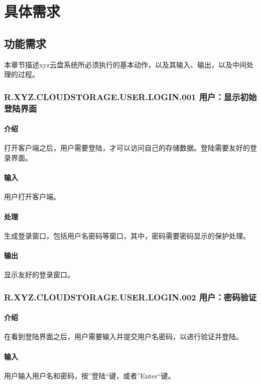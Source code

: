 \chapter{具体需求}
\section{功能需求}

本章节描述xyz云盘系统所必须执行的基本动作，以及其输入、输出，以及中间处理的过程。


\subsection{R.XYZ.CLOUDSTORAGE.USER.LOGIN.001 用户：显示初始登陆界面 }

\subsubsection{介绍}
打开客户端之后，用户需要登陆，才可以访问自己的存储数据。登陆需要友好的登录界面。

\subsubsection{输入}
用户打开客户端。

\subsubsection{处理}
生成登录窗口，包括用户名密码等窗口，其中，密码需要密码显示的保护处理。

\subsubsection{输出}
显示友好的登录窗口。

\subsection{R.XYZ.CLOUDSTORAGE.USER.LOGIN.002 用户：密码验证 }

\subsubsection{介绍}
在看到登陆界面之后，用户需要输入并提交用户名密码，以进行验证并登陆。

\subsubsection{输入}
用户输入用户名和密码，按”登陆“键，或者”Enter“键。

